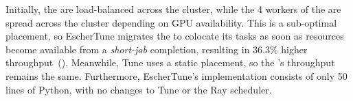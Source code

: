 Initially, the \shortjobs{} are load-balanced across the cluster, while the 4 workers of the \longjob{} are spread across the cluster depending on GPU availability. This is a sub-optimal placement, so EscherTune migrates the \longjob{} to colocate its tasks as soon as resources become available from a \emph{short-job} completion, resulting in 36.3\% higher throughput~().
Meanwhile, Tune uses a static placement, so the \longjob{}'s throughput remains the same.
Furthermore, EscherTune's implementation consists of only 50 lines of Python, with no changes to Tune or the Ray scheduler. %
 


